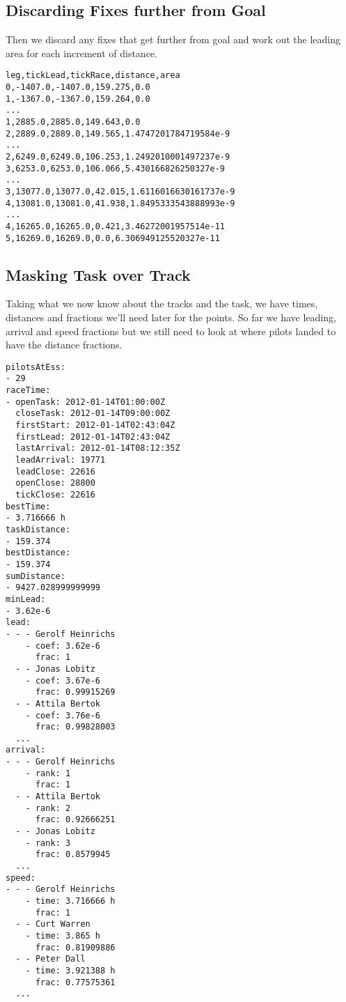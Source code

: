 \documentclass[gap.tex]{subfiles}
\begin{document}
\subsection{Discarding Fixes further from Goal}

Then we discard any fixes that get further from goal and work out the leading
area for each increment of distance.

\begin{lstlisting}[caption={Fixes getting closer to goal with leading area, rows of \texttt{*.discard-further.csv}}]
leg,tickLead,tickRace,distance,area
0,-1407.0,-1407.0,159.275,0.0
1,-1367.0,-1367.0,159.264,0.0
...
1,2885.0,2885.0,149.643,0.0
2,2889.0,2889.0,149.565,1.4747201784719584e-9
...
2,6249.0,6249.0,106.253,1.2492010001497237e-9
3,6253.0,6253.0,106.066,5.430166826250327e-9
...
3,13077.0,13077.0,42.015,1.6116016630161737e-9
4,13081.0,13081.0,41.938,1.8495333543888993e-9
...
4,16265.0,16265.0,0.421,3.46272001957514e-11
5,16269.0,16269.0,0.0,6.306949125520327e-11
\end{lstlisting}

\newpage
\subsection{Masking Task over Track}

Taking what we now know about the tracks and the task, we have times, distances
and fractions we'll need later for the points. So far we have leading, arrival
and speed fractions but we still need to look at where pilots landed to have
the distance fractions.

\begin{lstlisting}[caption={Leading, arrival and speed fractions of
\texttt{*.mask-track.yaml}}]
pilotsAtEss:
- 29
raceTime:
- openTask: 2012-01-14T01:00:00Z
  closeTask: 2012-01-14T09:00:00Z
  firstStart: 2012-01-14T02:43:04Z
  firstLead: 2012-01-14T02:43:04Z
  lastArrival: 2012-01-14T08:12:35Z
  leadArrival: 19771
  leadClose: 22616
  openClose: 28800
  tickClose: 22616
bestTime:
- 3.716666 h
taskDistance:
- 159.374
bestDistance:
- 159.374
sumDistance:
- 9427.028999999999
minLead:
- 3.62e-6
lead:
- - - Gerolf Heinrichs
    - coef: 3.62e-6
      frac: 1
  - - Jonas Lobitz
    - coef: 3.67e-6
      frac: 0.99915269
  - - Attila Bertok
    - coef: 3.76e-6
      frac: 0.99828003
  ...
arrival:
- - - Gerolf Heinrichs
    - rank: 1
      frac: 1
  - - Attila Bertok
    - rank: 2
      frac: 0.92666251
  - - Jonas Lobitz
    - rank: 3
      frac: 0.8579945
  ...
speed:
- - - Gerolf Heinrichs
    - time: 3.716666 h
      frac: 1
  - - Curt Warren
    - time: 3.865 h
      frac: 0.81909886
  - - Peter Dall
    - time: 3.921388 h
      frac: 0.77575361
  ...
\end{lstlisting}
\end{document}
